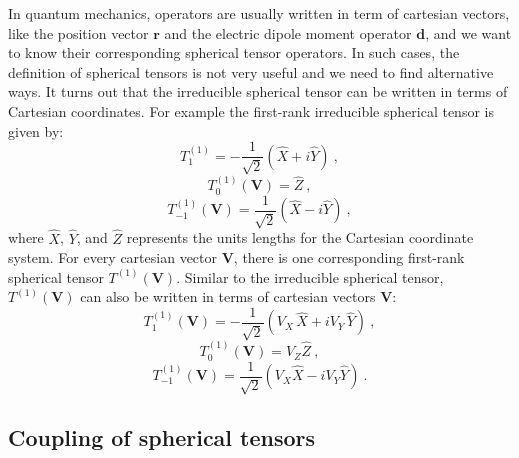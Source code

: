In quantum mechanics, operators are usually written in term of cartesian vectors, like the position vector 
$\mathbf{r}$ and the electric dipole moment operator $\mathbf{d}$, and we want to know their corresponding spherical 
tensor operators. In such cases, the definition of spherical tensors is 
not very useful and we need to find alternative ways. It turns out that the irreducible spherical tensor can be written in 
terms of Cartesian 
 coordinates. For example the first-rank irreducible spherical tensor is given by:
\begin{equation}
T^{(1)}_{1} = - \frac{1}{\sqrt{2}} (\hat{X} + i \hat{Y}) \ , 
\end{equation}
\begin{equation}
T^{(1)}_{0}(\mathbf{V})  = \hat{Z} \ ,
\end{equation}
\begin{equation}
T^{(1)}_{-1}(\mathbf{V}) =  \frac{1}{\sqrt{2}} (\hat{X} - i \hat{Y}) \ ,  
\end{equation}
where $\hat{X}$, $\hat{Y}$, and $\hat{Z}$ represents the units lengths for the Cartesian coordinate system.
For every cartesian vector $\mathbf{V}$, there is one corresponding first-rank spherical tensor $T^{(1)}(\mathbf{V})$.  
Similar to the irreducible spherical tensor,  $T^{(1)}(\mathbf{V})$ can also be written in terms of cartesian vectors 
$\mathbf{V}$:
\begin{equation}
T^{(1)}_{1}(\mathbf{V}) = - \frac{1}{\sqrt{2}} (V_{X}\,\hat{X} + i V_{Y}\,\hat{Y}) \ , \label{t11}
\end{equation}
\begin{equation}
T^{(1)}_{0}(\mathbf{V})  = V_{Z}\hat{Z} \ , \label{t10}
\end{equation}
\begin{equation}
T^{(1)}_{-1}(\mathbf{V}) =  \frac{1}{\sqrt{2}} (V_{X}\hat{X} - i V_{Y}\hat{Y}) \ .  \label{t1-1}
\end{equation}


\subsection{Coupling of spherical tensors}

